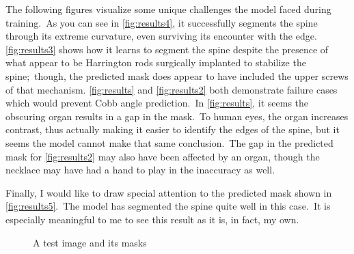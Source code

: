 \documentclass[conference]{IEEEtran}
\begin{document}
    The following figures visualize some unique challenges the model faced during training.\ As you can see in \autoref{fig:results4}, it successfully segments the spine through its extreme curvature, even surviving its encounter with the edge. \autoref{fig:results3} shows how it learns to segment the spine despite the presence of what appear to be Harrington rods surgically implanted to stabilize the spine;\ though, the predicted mask does appear to have included the upper screws of that mechanism. \autoref{fig:results} and \autoref{fig:results2} both demonstrate failure cases which would prevent Cobb angle prediction.\ In \autoref{fig:results}, it seems the obscuring organ results in a gap in the mask.\ To human eyes, the organ increases contrast, thus actually making it easier to identify the edges of the spine, but it seems the model cannot make that same conclusion.\ The gap in the predicted mask for \autoref{fig:results2} may also have been affected by an organ, though the necklace may have had a hand to play in the inaccuracy as well.

    Finally, I would like to draw special attention to the predicted mask shown in \autoref{fig:results5}.\ The model has segmented the spine quite well in this case.\ It is especially meaningful to me to see this result as it is, in fact, my own.
    
    \begin{figure}
        \caption{A test image and its masks}
        \label{fig:results}
        \centering
    \end{figure}
\end{document}
